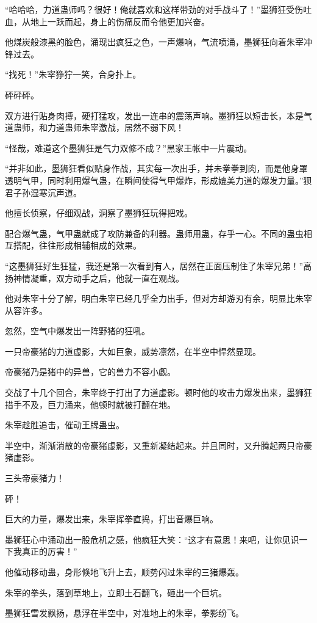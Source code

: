 \begin{this_body}
“哈哈哈，力道蛊师吗？很好！俺就喜欢和这样带劲的对手战斗了！”墨狮狂受伤吐血，从地上一跃而起，身上的伤痛反而令他更加兴奋。

他煤炭般漆黑的脸色，涌现出疯狂之色，一声爆响，气流喷涌，墨狮狂向着朱宰冲锋过去。

“找死！”朱宰狰狞一笑，合身扑上。

砰砰砰。

双方进行贴身肉搏，硬打猛攻，发出一连串的震荡声响。墨狮狂以短击长，本是气道蛊师，和力道蛊师朱宰激战，居然不弱下风！

“怪哉，难道这个墨狮狂是气力双修不成？”黑家王帐中一片震动。

“并非如此，墨狮狂看似贴身作战，其实每一次出手，并未拳拳到肉，而是他身罩透明气甲，同时利用爆气蛊，在瞬间使得气甲爆炸，形成媲美力道的爆发力量。”狈君子孙湿寒沉声道。

他擅长侦察，仔细观战，洞察了墨狮狂玩得把戏。

配合爆气蛊，气甲蛊就成了攻防兼备的利器。蛊师用蛊，存乎一心。不同的蛊虫相互搭配，往往形成相辅相成的效果。

“这墨狮狂好生狂猛，我还是第一次看到有人，居然在正面压制住了朱宰兄弟！”高扬神情凝重，双方动手之后，他就一直在观战。

他对朱宰十分了解，明白朱宰已经几乎全力出手，但对方却游刃有余，明显比朱宰从容许多。

忽然，空气中爆发出一阵野猪的狂吼。

一只帝豪猪的力道虚影，大如巨象，威势凛然，在半空中悍然显现。

帝豪猪乃是猪中的异兽，它的兽力不容小觑。

交战了十几个回合，朱宰终于打出了力道虚影。顿时他的攻击力爆发出来，墨狮狂措手不及，巨力涌来，他顿时就被打翻在地。

朱宰趁胜追击，催动王牌蛊虫。

半空中，渐渐消散的帝豪猪虚影，又重新凝结起来。并且同时，又升腾起两只帝豪猪虚影。

三头帝豪猪力！

砰！

巨大的力量，爆发出来，朱宰挥拳直捣，打出音爆巨响。

墨狮狂心中涌动出一股危机之感，他疯狂大笑：“这才有意思！来吧，让你见识一下我真正的厉害！”

他催动移动蛊，身形倏地飞升上去，顺势闪过朱宰的三猪爆轰。

朱宰的拳头，落到草地上，立即土石翻飞，砸出一个巨坑。

墨狮狂雪发飘扬，悬浮在半空中，对准地上的朱宰，拳影纷飞。


\end{this_body}
